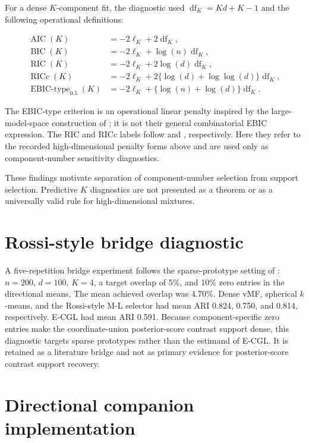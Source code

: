 \documentclass[preprint,12pt,authoryear]{elsarticle}
\begin{document}
For a dense $K$-component fit, the diagnostic used
$\operatorname{df}_K=Kd+K-1$ and the following operational definitions:

\[
\begin{aligned}
\operatorname{AIC}(K)&=-2\ell_K+2\operatorname{df}_K,\\
\operatorname{BIC}(K)&=-2\ell_K+\log(n)\operatorname{df}_K,\\
\operatorname{RIC}(K)&=-2\ell_K+2\log(d)\operatorname{df}_K,\\
\operatorname{RICc}(K)&=-2\ell_K+2\{\log(d)+\log\log(d)\}\operatorname{df}_K,\\
\operatorname{EBIC\text{-}type}_{0.5}(K)&=-2\ell_K+
\{\log(n)+\log(d)\}\operatorname{df}_K.
\end{aligned}
\]

The EBIC-type criterion is an operational linear penalty inspired by the
large-model-space construction of \citet{chen2008ebic}; it is not their general
combinatorial EBIC expression.
The RIC and RICc labels follow \citet{foster1994ric} and
\citet{zhang2010ricc}, respectively. Here they refer to the recorded
high-dimensional penalty forms above and are used only as component-number
sensitivity diagnostics.

These findings motivate separation of component-number selection from support
selection. Predictive $K$ diagnostics are not presented as a theorem or as a
universally valid rule for high-dimensional mixtures.

\section{Rossi-style bridge diagnostic}
\label{sec:s-rossi-bridge}

A five-repetition bridge experiment follows the sparse-prototype setting of
\citet{rossi2022sparsevmf}: $n=200$, $d=100$, $K=4$, a target overlap of 5\%, and
10\% zero entries in the directional means. The mean achieved overlap was
4.70\%. Dense vMF, spherical $k$-means, and the Rossi-style M-L selector had mean
ARI 0.824, 0.750, and 0.814, respectively. E-CGL had mean ARI 0.591. Because
component-specific zero entries make the coordinate-union posterior-score contrast support
dense, this diagnostic targets sparse prototypes rather than the estimand of
E-CGL. It is retained as a literature bridge and not as primary evidence for
posterior-score contrast support recovery.

\section{Directional companion implementation}
\label{sec:s-target-diagnostic}
\end{document}
